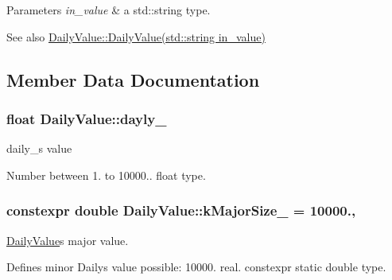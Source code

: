 \begin{DoxyParams}{Parameters}
{\em in\+\_\+value} & a std\+::string type.\\
\hline
\end{DoxyParams}
\begin{DoxySeeAlso}{See also}
\hyperlink{classDailyValue_ad60e0817a2c4b84f5e2d3e99638de14a}{Daily\+Value\+::\+Daily\+Value(std\+::string in\+\_\+value)} 
\end{DoxySeeAlso}


\subsection{Member Data Documentation}
\subsubsection[{\texorpdfstring{dayly\+\_\+}{dayly_}}]{\setlength{\rightskip}{0pt plus 5cm}float Daily\+Value\+::dayly\+\_\+\hspace{0.3cm}{\ttfamily [private]}}\hypertarget{classDailyValue_a6316632ee7e3c421b917a423c22b9182}{}\label{classDailyValue_a6316632ee7e3c421b917a423c22b9182}


daily\+\_\+\textquotesingle{}s value 

Number between 1. to 10\textquotesingle{}000.. float type. 
\subsubsection[{\texorpdfstring{k\+Major\+Size\+\_\+}{kMajorSize_}}]{\setlength{\rightskip}{0pt plus 5cm}constexpr double Daily\+Value\+::k\+Major\+Size\+\_\+ = 10000.\hspace{0.3cm}{\ttfamily [static]}, {\ttfamily [private]}}\hypertarget{classDailyValue_ac96d2da50ecbba486d4145ddc477cba5}{}\label{classDailyValue_ac96d2da50ecbba486d4145ddc477cba5}


\hyperlink{classDailyValue}{Daily\+Value}\textquotesingle{}s major value. 

Defines minor Daily\textquotesingle{}s value possible\+: 10\textquotesingle{}000. real. constexpr static double type. 
